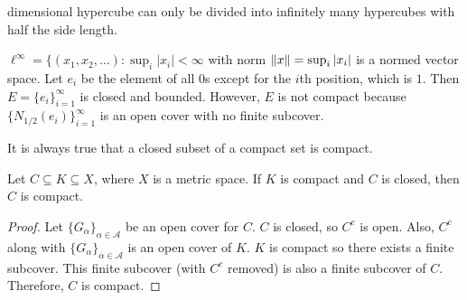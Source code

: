 dimensional hypercube can only be divided into infinitely many
hypercubes with half the side length.
\begin{example}\label{ex:ellinf}
  $\ell^\infty = \{ (x_1, x_2, ...) : \sup_{i} |x_i| < \infty$ with
  norm $\left\Vert {x} \right\Vert = \sup_{i} |x_i|$ is a normed vector space. Let $e_i$
  be the element of all $0$s except for the $i$th position, which is
  $1$. Then $E = \{e_i\}_{i=1}^\infty$ is closed and bounded. However,
  $E$ is not compact because $\{N_{1/2}(e_i)\}_{i=1}^\infty$ is an
  open cover with no finite subcover. 
\end{example}
It is always true that a closed subset of a compact set is compact.
\begin{lemma}
  Let $C \subseteq K \subseteq X$, where $X$ is a metric space.  If
  $K$ is compact and $C$ is closed, then $C$ is compact. 
\end{lemma}
\begin{proof}
  Let $\{G_{\alpha}\}_{\alpha \in \mathcal{A}}$ be an open cover for
  $C$. $C$ is closed, so $C^c$ is open. Also, $C^c$ along with
  $\{G_{\alpha}\}_{\alpha \in \mathcal{A}}$ is an open cover of
  $K$. $K$ is compact so there exists a finite subcover. This finite
  subcover (with $C^c$ removed) is also a finite subcover of
  $C$. Therefore, $C$ is compact. 
\end{proof}

